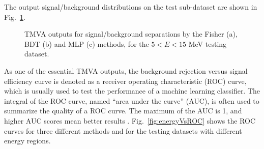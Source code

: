 The output signal/background distributions on the test sub-dataset are shown in Fig.~\ref{output_separation_allE}.
\begin{figure}[htbp]
	\centering
	\caption[TMVA outputs for signal/background separations by different methods.]{TMVA outputs for signal/background separations by the Fisher (a), BDT (b) and MLP (c) methods, for the $5<E<15$ MeV testing dataset.\label{output_separation_allE}}
\end{figure}
As one of the essential TMVA outputs, the background rejection versus signal efficiency curve is denoted as a receiver operating characteristic (ROC) curve, which is usually used to test the performance of a machine learning classifier. The integral of the ROC curve, named ``area under the curve'' (AUC), is often used to summarize the quality of a ROC curve. The maximum of the AUC is 1, and higher AUC scores mean better results \cite{murphy2012machine}. Fig.~\ref{fig:energyVsROC} shows the ROC curves for three different methods and for the testing datasets with different energy regions.


